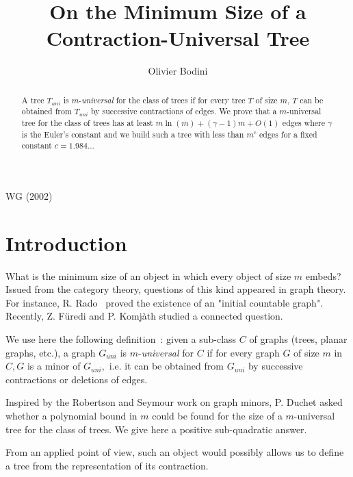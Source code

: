 \documentclass{llncs}
\begin{document}
\title{On the Minimum Size of a Contraction-Universal Tree}
\author{Olivier Bodini}
 \maketitle
\pagestyle{myheadings}  {{\sc WG
(2002)}\hfill}

\begin{abstract}

A tree $T_{uni} $ is $m$-\textit{universal} for the class of trees
if for every tree $T$ of size $m$, $T$ can be obtained from
$T_{uni} $ by successive contractions of edges. We prove that a
$m$-universal tree for the class of trees has at least $m\ln (m) +
(\gamma - 1)m + O(1)$ edges where $\gamma $ is the Euler's
constant and we build such a tree with less than $m^c$ edges for a
fixed constant $c = 1.984...$
\end{abstract}



\section{Introduction}





What is the minimum size of an object in which every object of
size $m$ embeds? Issued from the category theory, questions of
this kind appeared in graph theory. For instance, R. Rado~
\cite{Ra} proved the existence of an "initial countable graph".
Recently, Z. F\"{u}redi and P. Komj\`{a}th \cite{FK} studied a
connected question.

We use here the following definition~: given a sub-class $C$ of
graphs (trees, planar graphs, etc.), a graph $G_{uni} $ is
$m$-\textit{universal} for $C$ if for every graph $G$ of size $m$
in $C, G$ is a minor of $G_{uni} ,$ i.e. it can be obtained from
$G_{uni}$ by successive contractions or deletions of edges.

Inspired by the Robertson and Seymour work \cite{RS} on graph
minors, P. Duchet asked whether a polynomial bound in $m$ could be
found for the size of a $m$-universal tree for the class of trees.
We give here a positive sub-quadratic answer.

From an applied point of view, such an object would possibly
allows us to define a tree from the representation of its
contraction.
\end{document}
